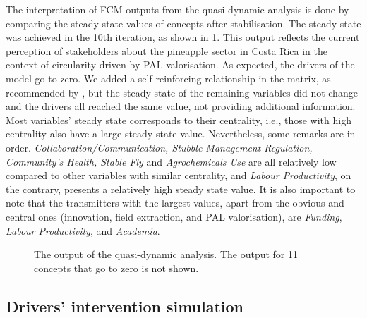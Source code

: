 The interpretation of FCM outputs from the quasi-dynamic analysis is done by comparing the steady state values of concepts after stabilisation. The steady state was achieved in the 10th iteration, as shown in \cref{outputFCM0}. This output reflects the current perception of stakeholders about the pineapple sector in Costa Rica in the context of circularity driven by PAL valorisation. As expected, the drivers of the model go to zero. We added a self-reinforcing relationship in the matrix, as recommended by \cite{diniz2015mapping}, but the steady state of the remaining variables did not change and the drivers all reached the same value, not providing additional information. Most variables' steady state corresponds to their centrality, i.e., those with high centrality also have a large steady state value. Nevertheless, some remarks are in order. \textit{Collaboration/Communication, Stubble Management Regulation, Community's Health, Stable Fly} and \textit{Agrochemicals Use} are all relatively low compared to other variables with similar centrality, and \textit{Labour Productivity}, on the contrary, presents a relatively high steady state value. It is also important to note that the transmitters with the largest values, apart from the obvious and central ones (innovation, field extraction, and PAL valorisation), are \textit{Funding}, \textit{Labour Productivity}, and \textit{Academia}. 


\begin{figure}[H]
\caption{The output of the quasi-dynamic analysis. The output for 11 concepts that go to zero is not shown.}  
\label{outputFCM0}
\centering

\end{figure}


\subsection{Drivers' intervention simulation}

